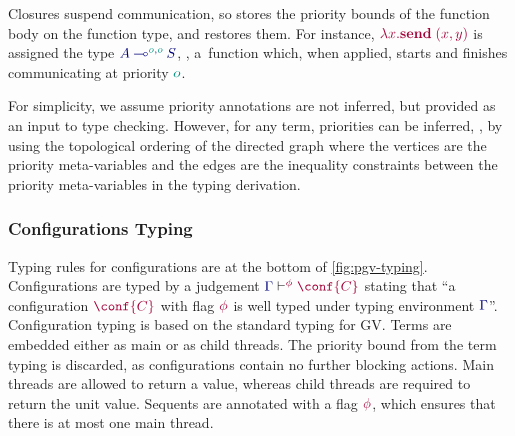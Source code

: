 Closures suspend communication, so  stores the priority bounds of the function body on the function type, and  restores them. For instance, $\tm{\lambda{x}.\send\;\pair{x}{y}}$ is assigned the type $\ty{\tylolli[\cs{o},\cs{o}]{A}{S}}$, \ie, a~function which, when applied, starts and finishes communicating at priority $\cs{o}$.
\begin{mathpar}
\end{mathpar}

For simplicity, we assume priority annotations are not inferred, but provided as an input to type checking. However, for any term, priorities can be inferred, \eg, by using the topological ordering of the directed graph where the vertices are the priority meta-variables and the edges are the inequality constraints between the priority meta-variables in the typing derivation.

\subsubsection*{Configurations Typing}
Typing rules for configurations are at the bottom of \cref{fig:pgv-typing}. Configurations are typed by a judgement $\cseq[\phi]{\ty{\Gamma}}{\conf{C}}$ stating that ``a configuration $\tm{\conf{C}}$ with flag $\tm\phi$ is well typed under typing environment $\ty{\Gamma}$''. Configuration typing is based on the standard typing for GV. Terms are embedded either as main or as child threads. The priority bound from the term typing is discarded, as configurations contain no further blocking actions. Main threads are allowed to return a value, whereas child threads are required to return the unit value. Sequents are annotated with a flag $\tm\phi$, which ensures that there is at most one main thread.

